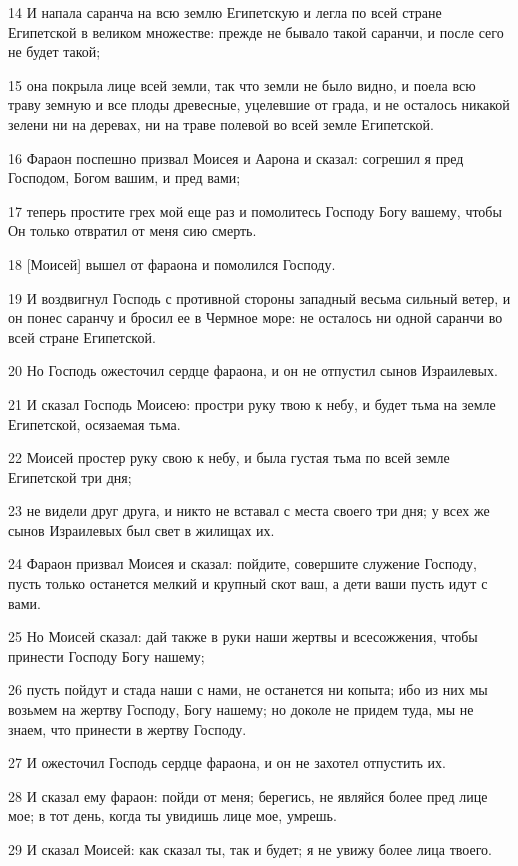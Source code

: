 \par 14 И напала саранча на всю землю Египетскую и легла по всей стране Египетской в великом множестве: прежде не бывало такой саранчи, и после сего не будет такой;
\par 15 она покрыла лице всей земли, так что земли не было видно, и поела всю траву земную и все плоды древесные, уцелевшие от града, и не осталось никакой зелени ни на деревах, ни на траве полевой во всей земле Египетской.
\par 16 Фараон поспешно призвал Моисея и Аарона и сказал: согрешил я пред Господом, Богом вашим, и пред вами;
\par 17 теперь простите грех мой еще раз и помолитесь Господу Богу вашему, чтобы Он только отвратил от меня сию смерть.
\par 18 [Моисей] вышел от фараона и помолился Господу.
\par 19 И воздвигнул Господь с противной стороны западный весьма сильный ветер, и он понес саранчу и бросил ее в Чермное море: не осталось ни одной саранчи во всей стране Египетской.
\par 20 Но Господь ожесточил сердце фараона, и он не отпустил сынов Израилевых.
\par 21 И сказал Господь Моисею: простри руку твою к небу, и будет тьма на земле Египетской, осязаемая тьма.
\par 22 Моисей простер руку свою к небу, и была густая тьма по всей земле Египетской три дня;
\par 23 не видели друг друга, и никто не вставал с места своего три дня; у всех же сынов Израилевых был свет в жилищах их.
\par 24 Фараон призвал Моисея и сказал: пойдите, совершите служение Господу, пусть только останется мелкий и крупный скот ваш, а дети ваши пусть идут с вами.
\par 25 Но Моисей сказал: дай также в руки наши жертвы и всесожжения, чтобы принести Господу Богу нашему;
\par 26 пусть пойдут и стада наши с нами, не останется ни копыта; ибо из них мы возьмем на жертву Господу, Богу нашему; но доколе не придем туда, мы не знаем, что принести в жертву Господу.
\par 27 И ожесточил Господь сердце фараона, и он не захотел отпустить их.
\par 28 И сказал ему фараон: пойди от меня; берегись, не являйся более пред лице мое; в тот день, когда ты увидишь лице мое, умрешь.
\par 29 И сказал Моисей: как сказал ты, так и будет; я не увижу более лица твоего.

